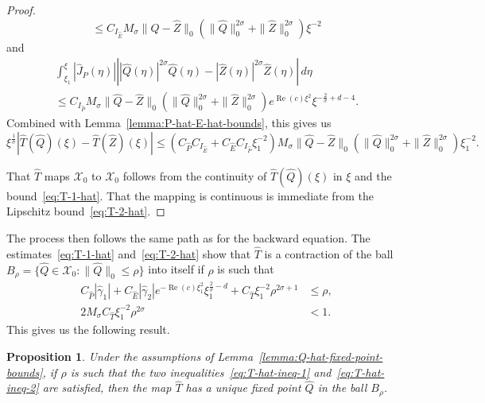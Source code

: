 \documentclass[11pt]{article}
\DeclareMathOperator{\real}{Re}
\newcommand{\Space}{\mathcal{X}}
\newtheorem{proposition}[definition]{Proposition}
\begin{document}
\begin{proof}
\begin{equation*}
    \leq C_{I_{\hat{E}}}M_{\sigma} \|\hat{Q} - \hat{Z}\|_{0}(\|\hat{Q}\|_{0}^{2\sigma} + \|\hat{Z}\|_{0}^{2\sigma})
    \xi^{-2}
  \end{equation*}
  and
  \begin{multline*}
    \int_{\xi_{1}}^{\xi}|\hat{J}_{P}(\eta)|\left||\hat{Q}(\eta)|^{2\sigma}\hat{Q}(\eta) - |\hat{Z}(\eta)|^{2\sigma}\hat{Z}(\eta)\right|\,d\eta\\
    \leq C_{I_{\hat{P}}}M_{\sigma} \|\hat{Q} - \hat{Z}\|_{0}(\|\hat{Q}\|_{0}^{2\sigma} + \|\hat{Z}\|_{0}^{2\sigma})
    e^{\real(c)\xi^{2}}\xi^{-\frac{2}{\sigma} + d - 4}.
  \end{multline*}
  Combined with Lemma~\ref{lemma:P-hat-E-hat-bounds}, this gives us
  \begin{equation*}
    \xi^{\frac{1}{\sigma}}|\hat{T}(\hat{Q})(\xi) - \hat{T}(\hat{Z})(\xi)|
    \leq (C_{\hat{P}}C_{I_{\hat{E}}} + C_{\hat{E}}C_{I_{\hat{P}}}\xi_{1}^{-2})M_{\sigma} \|\hat{Q} - \hat{Z}\|_{0}(\|\hat{Q}\|_{0}^{2\sigma} + \|\hat{Z}\|_{0}^{2\sigma})\xi_{1}^{-2}.
  \end{equation*}

  That \(\hat{T}\) maps \(\Space_{0}\) to \(\Space_{0}\) follows from
  the continuity of \(\hat{T}(\hat{Q})(\xi)\) in \(\xi\) and the
  bound~\eqref{eq:T-1-hat}. That the mapping is continuous is
  immediate from the Lipschitz bound~\eqref{eq:T-2-hat}.
\end{proof}

The process then follows the same path as for the backward equation.
The estimates~\eqref{eq:T-1-hat} and~\eqref{eq:T-2-hat} show that
\(\hat{T}\) is a contraction of the ball
\(B_{\rho} = \{\hat{Q} \in \Space_{0} \colon \|\hat{Q}\|_{0} \leq \rho\}\)
into itself if \(\rho\) is such that
\begin{align}
  \label{eq:T-hat-ineq-1}
  C_{\hat{P}}|\hat{\gamma}_{1}|
  + C_{\hat{E}}|\hat{\gamma}_{2}|e^{-\real(c)\xi_{1}^{2}}\xi_{1}^{\frac{2}{\sigma} - d}
  + C_{\hat{T}}\xi_{1}^{-2}\rho^{2\sigma + 1} &\leq \rho,\\
  \label{eq:T-hat-ineq-2}
  2M_{\sigma}C_{\hat{T}}\xi_{1}^{-2}\rho^{2\sigma} &< 1.
\end{align}
This gives us the following result.

\begin{proposition}\label{prop:Q-hat-fixed-point}
  Under the assumptions of Lemma~\ref{lemma:Q-hat-fixed-point-bounds},
  if \(\rho\) is such that the two
  inequalities~\eqref{eq:T-hat-ineq-1} and~\eqref{eq:T-hat-ineq-2} are
  satisfied, then the map \(\hat{T}\) has a unique fixed point
  \(\hat{Q}\) in the ball \(B_{\rho}\).
\end{proposition}
\end{document}
